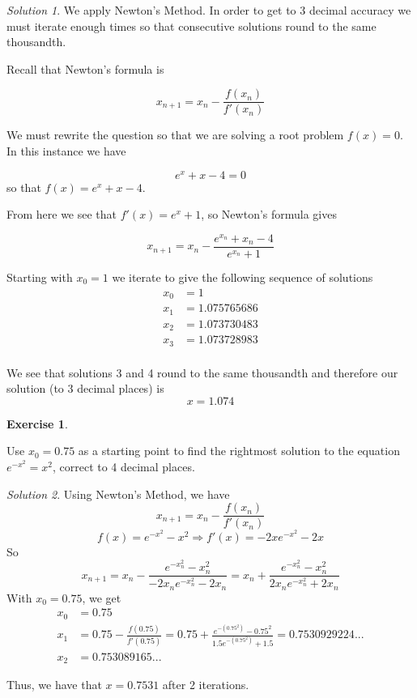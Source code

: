 \documentclass[
]{book}
\theoremstyle{definition}
\theoremstyle{definition}
\theoremstyle{definition}
\newtheorem{exercise}{Exercise}[chapter]
\theoremstyle{definition}
\theoremstyle{remark}
\newtheorem*{solution}{Solution}
\begin{document}
\begin{solution}

We apply Newton's Method. In order to get to 3 decimal accuracy we must iterate enough times so that consecutive solutions round to the same thousandth.

Recall that Newton's formula is

\[
    x_{n+1} = x_n - \frac{f(x_n)}{f'(x_n)}
\]

We must rewrite the question so that we are solving a root problem \(f(x) = 0\). In this instance we have

\[
    e^x + x - 4 = 0
\]
so that \(f(x) = e^x + x -4\).

From here we see that \(f'(x) = e^x + 1\), so Newton's formula gives

\[
    x_{n+1} = x_n - \frac{e^{x_n} + x_n - 4}{e^{x_n} + 1}
\]

Starting with \(x_0 = 1\) we iterate to give the following sequence of solutions
\begin{align*}
    x_0 &=  1 \\
    x_1 &= 1.075765686 \\
    x_2 &= 1.073730483 \\
    x_3 &= 1.073728983 \\
\end{align*}

We see that solutions 3 and 4 round to the same thousandth and therefore our solution (to 3 decimal places) is
\[
    x = 1.074
\]

\end{solution}

\begin{exercise}
\protect\hypertarget{exr:unlabeled-div-269}{}\label{exr:unlabeled-div-269}

Use \(x_0 = 0.75\) as a starting point to find the rightmost solution to the equation \(e^{-x^2}=x^2\), correct to 4 decimal places.

\end{exercise}

\begin{solution}

Using Newton's Method, we have
\[x_{n+1}=x_n-\frac{f(x_n)}{f'(x_n)}\]
\[f(x)=e^{-x^2}-x^2 \Rightarrow f'(x)=-2xe^{-x^2}-2x\]
So
\[\displaystyle x_{n+1}=x_n-\frac{e^{-x_n^2}-x_n^2}{-2x_ne^{-x_n^2}-2x_n}=x_n+\frac{e^{-x_n^2}-x_n^2}{2x_ne^{-x_n^2}+2x_n}\]
With \(x_0=0.75\), we get
\begin{align*}
x_0 &= 0.75\\
x_1 & =0.75-\frac{f(0.75)}{f'(0.75)}=0.75+\frac{e^{-(0.75^2)}-0.75^2}{1.5e^{-(0.75^2)}+1.5}=0.7530929224...\\
x_2 & =0.753089165...
\end{align*}

Thus, we have that \(x=0.7531\) after 2 iterations.

\end{solution}
\end{document}
